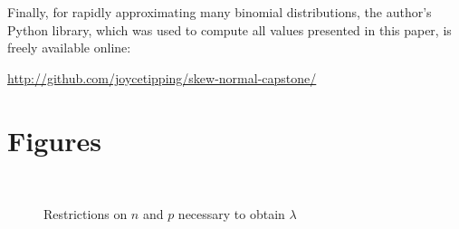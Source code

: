 \documentclass{article}
\begin{document}
Finally, for rapidly approximating many binomial distributions, the author's
Python library, which was used to compute all values presented in this paper,
is freely available online:

\url{http://github.com/joycetipping/skew-normal-capstone/}

\clearpage

\appendix
\section{Figures}
\label{app:figures}

\begin{figure}[h]
  \centering
  \\ \vspace{5mm}
  \caption{Restrictions on $n$ and $p$ necessary to obtain $\lambda$}
  \label{fig:sn-restriction}
\end{figure}
\end{document}
